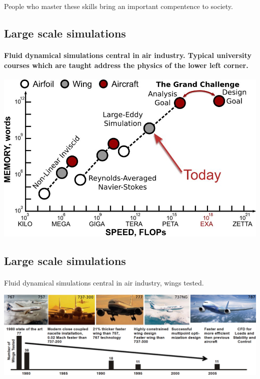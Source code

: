 \documentclass[%
twoside,                 %
final,                   %
10pt]{article}
\begin{document}
\noindent
People who master these skills bring an important compentence to society.



\subsection*{Large scale simulations}

\paragraph{Fluid dynamical simulations central in air industry.  Typical university courses which are taught address the physics of the lower left corner.}


\centerline{\includegraphics[width=0.6\linewidth]{figures/fig10.jpg}}




\subsection*{Large scale simulations}

\paragraph{}
Fluid dynamical simulations central in air industry, wings tested.


\centerline{\includegraphics[width=1.0\linewidth]{figures/fig8.jpg}}
\end{document}
